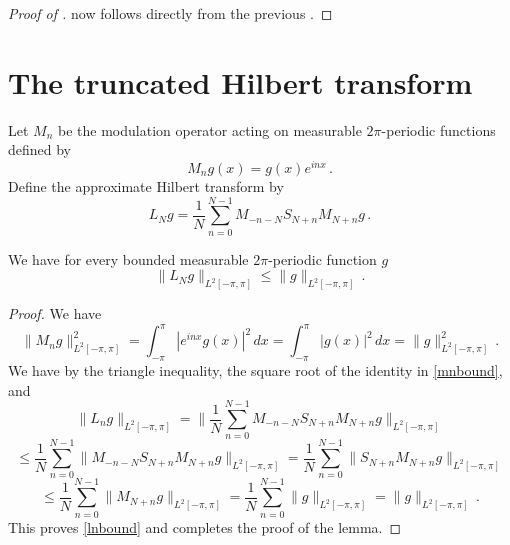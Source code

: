 \begin{proof}[Proof of ]
\leanok
{}
     now follows directly from the previous .
\end{proof}


\section{The truncated Hilbert transform}
\label{10hilbert}





Let $M_n$ be the modulation operator
acting on measurable $2\pi$-periodic functions
defined by
\begin{equation}
    M_ng(x)=g(x) e^{inx}\, .
\end{equation}
Define the approximate Hilbert transform by
\begin{equation}
    L_N g=\frac 1N\sum_{n=0}^{N-1}
       M_{-n-N} S_{N+n}M_{N+n}g\, .
\end{equation}


\begin{lemma}
\label{modulated-averaged-projection}
\leanok
{}
We have for every bounded measurable $2\pi$-periodic function $g$
\begin{equation}\label{lnbound}
    \|L_Ng\|_{L^2[-\pi, \pi]}\le \|g\|_{L^2[-\pi, \pi]}\,.
\end{equation}
\end{lemma}
\begin{proof}
    \leanok
    We have
    \begin{equation}\label{mnbound}
        \|M_ng\|_{L^2[-\pi, \pi]}^2=\int_{-\pi}^{\pi} |e^{inx}g(x)|^2\, dx
        =\int_{-\pi}^{\pi} |g(x)|^2\, dx=\|g\|_{L^2[-\pi, \pi]}^2\, .
    \end{equation}
     We have by the triangle inequality, the square root of the identity in \eqref{mnbound}, and 
    \begin{equation*}
        \|L_ng\|_{L^2[-\pi, \pi]}=\|\frac 1N\sum_{n=0}^{N-1}
       M_{-n-N} S_{N+n}M_{N+n}g\|_{L^2[-\pi, \pi]}
    \end{equation*}
    \begin{equation*}
        \le \frac 1N\sum_{n=0}^{N-1} \|
       M_{-n-N} S_{N+n}M_{N+n}g\|_{L^2[-\pi, \pi]}
         = \frac 1N\sum_{n=0}^{N-1} \|
    S_{N+n}M_{N+n}g\|_{L^2[-\pi, \pi]}
    \end{equation*}
     \begin{equation}
     \le \frac 1N\sum_{n=0}^{N-1} \|
 M_{N+n}g\|_{L^2[-\pi, \pi]} = \frac 1N\sum_{n=0}^{N-1} \|
g\|_{L^2[-\pi, \pi]} =\|g\|_{L^2[-\pi, \pi]}\, .
    \end{equation}
This proves \eqref{lnbound} and completes the proof of the lemma.
\end{proof}

